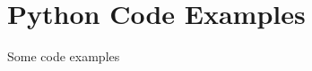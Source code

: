 \chapter{Python Code Examples}
\label{ch:code-python}

\begin{cluster}
\label{grp:prmbl:code-python::_1_}

\begin{preamble}
\label{prmbl:code-python::_1_}
Some code examples

\end{preamble}
\end{cluster}

